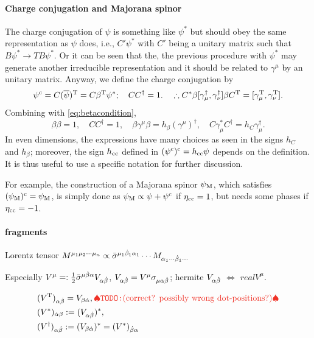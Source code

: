 \documentclass[CheatSheet]{subfiles}
\begin{document}
\paragraph{Charge conjugation and Majorana spinor}
The charge conjugation of $\psi$ is something like $\psi^*$ but should obey the same representation as $\psi$ does, i.e., $C'\psi^*$ with $C'$ being a unitary matrix such that $B\psi^*\to TB\psi^*$. Or it can be seen that the, the previous procedure with $\psi^*$ may generate another irreducible representation and it should be related to $\gamma^\mu$ by an unitary matrix. Anyway, we define the charge conjugation by
\begin{equation}
 \psi^{\mathrm{c}} = C(\overline\psi)^{\mathrm{T}} = C\beta^{\mathrm{T}}\psi^*;\quad CC^\dagger = 1.
\quad
\therefore
C^*\beta[\gamma_\mu^\dagger,\gamma_\nu^\dagger]\beta C^{\mathrm{T}} =
[\gamma_\mu^{\mathrm{T}},\gamma_\nu^{\mathrm{T}}].
\end{equation}
Combining with \cref{eq:betacondition},
\begin{equation}
 \beta\beta=1,\quad C C^\dagger = 1,\quad
 \beta\gamma^\mu\beta=h_\beta(\gamma^\mu)^\dagger,\quad
 C\gamma_\mu^* C^\dagger = h_C\gamma_\mu^\dagger.
\end{equation}
In even dimensions, the expressions have many choices as seen in the signs $h_C$ and $h_\beta$; moreover, the sign $h\w{cc}$ defined in $(\psi^\cc)^\cc=h\w{cc}\psi$ depends on the definition.
It is thus useful to use a specific notation for further discussion.

For example, the construction of a Majorana spinor $\psi\w M$, which satisfies $(\psi\w M)^\cc=\psi\w M$, is simply done as $\psi\w{M}\propto\psi+\psi^\cc$ if $\eta\w{cc}=1$, but needs some phases if $\eta\w{cc}=-1$.

\paragraph{fragments}
\vspace{2em}

Lorentz tensor $
M^{\mu_1\mu_2\cdots\mu_n}\propto
\bar\sigma^{\mu_1{\dot\beta}_1\alpha_1}\cdots M_{\alpha_1\cdots{\dot\beta}_1\cdots}
$

Especially
$V^\mu =: \frac12 \bar\sigma^{\mu{\dot\beta}\alpha}V_{\alpha{\dot\beta}}$,
$V_{\alpha{\dot\beta}}=V^\mu\sigma_{\mu\alpha{\dot\beta}}$; hermite $V_{\alpha{\dot\beta}}$ $\Leftrightarrow$ $real V^\mu$.

\begin{align}
 &(V^\TT)_{\alpha\dbeta} = V_{\beta\dalpha},\text{\TODO{(correct? possibly wrong dot-positions?)}}\\
 &(V^*)_{\dalpha\beta}:= (V_{\alpha\dbeta})^*,\\
 &(V^\dagger)_{\alpha\dbeta} := (V_{\beta\dalpha})^* = (V^*)_{\dbeta\alpha}
\end{align}
\end{document}
